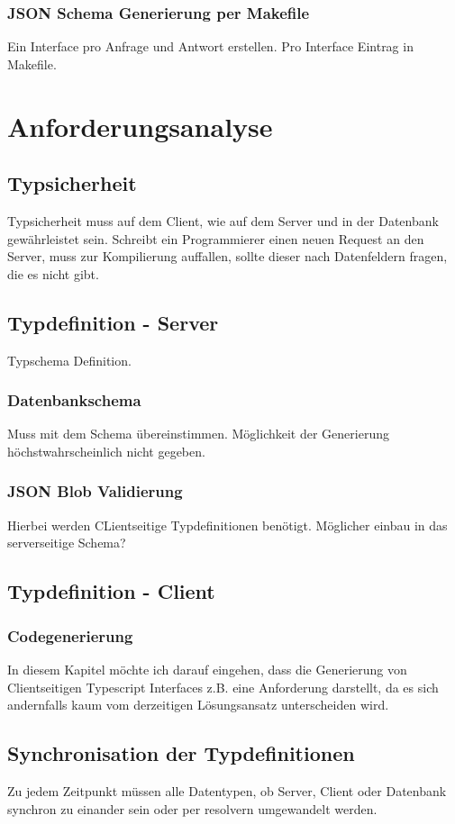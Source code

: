 \subsection{JSON Schema Generierung per Makefile}
Ein Interface pro Anfrage und Antwort erstellen. Pro Interface Eintrag in Makefile.

\chapter{Anforderungsanalyse}

\section{Typsicherheit}
Typsicherheit muss auf dem Client, wie auf dem Server und in der Datenbank gewährleistet sein. Schreibt ein Programmierer einen neuen Request an den Server,
muss zur Kompilierung auffallen, sollte dieser nach Datenfeldern fragen, die es nicht gibt.

\section{Typdefinition - Server}
Typschema Definition.
\subsection{Datenbankschema}
Muss mit dem Schema übereinstimmen. Möglichkeit der Generierung höchstwahrscheinlich nicht gegeben.
\subsection{JSON Blob Validierung}
Hierbei werden CLientseitige Typdefinitionen benötigt. Möglicher einbau in das serverseitige Schema?

\section{Typdefinition - Client}
\subsection{Codegenerierung}
In diesem Kapitel möchte ich darauf eingehen, dass die Generierung von Clientseitigen Typescript Interfaces z.B. eine Anforderung darstellt, 
da es sich andernfalls kaum vom derzeitigen Lösungsansatz unterscheiden wird. 


\section{Synchronisation der Typdefinitionen}
Zu jedem Zeitpunkt müssen alle Datentypen, ob Server, Client oder Datenbank synchron zu einander sein oder per resolvern umgewandelt werden.

